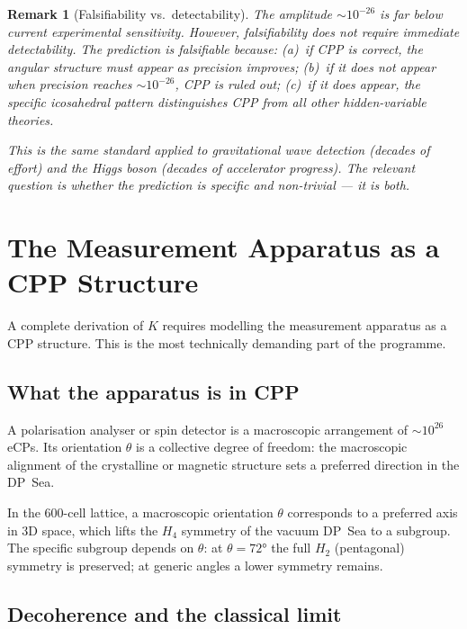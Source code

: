 \documentclass[11pt,letterpaper]{article}
\newtheorem{remark}[theorem]{Remark}
\begin{document}
\begin{remark}[Falsifiability vs.\ detectability]
The amplitude $\sim 10^{-26}$ is far below current experimental
sensitivity.  However, falsifiability does not require immediate
detectability.  The prediction is falsifiable because:
(a)~if CPP is correct, the angular structure \emph{must} appear as
precision improves; (b)~if it does not appear when precision reaches
$\sim 10^{-26}$, CPP is ruled out; (c)~if it does appear, the
specific icosahedral pattern distinguishes CPP from all other
hidden-variable theories.

This is the same standard applied to gravitational wave detection
(decades of effort) and the Higgs boson (decades of accelerator
progress).  The relevant question is whether the prediction is
\emph{specific} and \emph{non-trivial} --- it is both.
\end{remark}

\section{The Measurement Apparatus as a CPP Structure}
\label{sec:apparatus}

A complete derivation of $K$ requires modelling the measurement
apparatus as a CPP structure.  This is the most technically demanding
part of the programme.

\subsection{What the apparatus is in CPP}

A polarisation analyser or spin detector is a macroscopic arrangement
of $\sim 10^{26}$ eCPs.  Its orientation $\theta$ is a collective
degree of freedom: the macroscopic alignment of the crystalline or
magnetic structure sets a preferred direction in the DP~Sea.

In the 600-cell lattice, a macroscopic orientation $\theta$ corresponds
to a preferred axis in 3D space, which lifts the $H_4$ symmetry of
the vacuum DP~Sea to a subgroup.  The specific subgroup depends on
$\theta$: at $\theta = 72°$ the full $H_2$ (pentagonal) symmetry is
preserved; at generic angles a lower symmetry remains.

\subsection{Decoherence and the classical limit}
\end{document}
